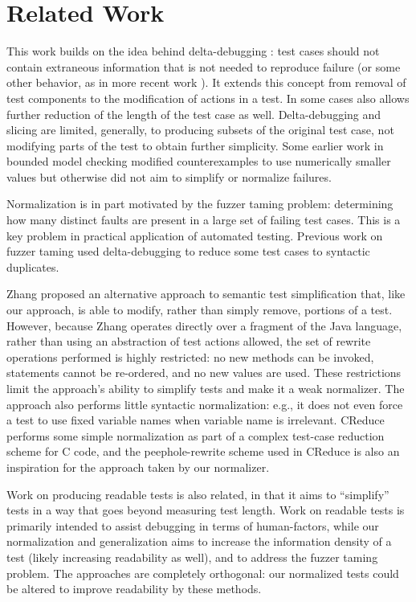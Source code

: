 \section{Related Work}

This work builds on the idea behind delta-debugging \cite{DD}: test
cases should not contain extraneous information that is not needed to
reproduce failure (or some other behavior, as in more recent work
\cite{icst2014,stvrcausereduce}).  It extends this concept from
removal of test components to the modification of actions in a test.
In some cases also allows further reduction of the length of the test
case as well.  Delta-debugging and slicing \cite{TCminim} are limited,
generally, to producing subsets of the original test case, not
modifying parts of the test to obtain further simplicity.  Some
earlier work in bounded model checking modified counterexamples to use
numerically smaller values \cite{MakeMost} but otherwise did not aim
to simplify or normalize failures.

Normalization is in part motivated by the fuzzer taming \cite{PLDI13}
problem: determining how many distinct faults are present in a large
set of failing test cases.  This is a key problem in practical
application of automated testing.  Previous work on fuzzer taming
\cite{PLDI13} used delta-debugging to reduce some test cases to
syntactic duplicates.

Zhang \cite{SaiSimple} proposed an alternative approach to semantic
test simplification that, like our approach, is able to
modify, rather than simply remove, portions of a test.  However,
because Zhang operates directly over a fragment of the Java language,
rather than using an abstraction of test actions allowed, the set of
rewrite operations performed is highly restricted:  no new methods can
be invoked, statements cannot be re-ordered, and no new values are
used.  These restrictions limit the approach's ability to simplify tests and make it a
weak normalizer.  The approach also performs little syntactic
normalization: e.g., it does not even force a test to use fixed
variable names when variable name is irrelevant.
CReduce \cite{CReduce} performs some simple normalization as part of a
complex test-case reduction scheme for C code, and the
peephole-rewrite scheme used in CReduce is also an inspiration for the
approach taken by our normalizer.

Work on producing readable tests \cite{Guava,Readable} is also
related, in that it aims to ``simplify'' tests in a way that goes
beyond measuring test length.  Work on readable tests is primarily
intended to assist debugging in  terms of human-factors, while our
normalization and generalization aims to increase the information
density of a test (likely increasing readability as well), and to address the fuzzer taming problem.  The approaches are
completely orthogonal: our normalized tests could be altered to
improve readability by these methods.

